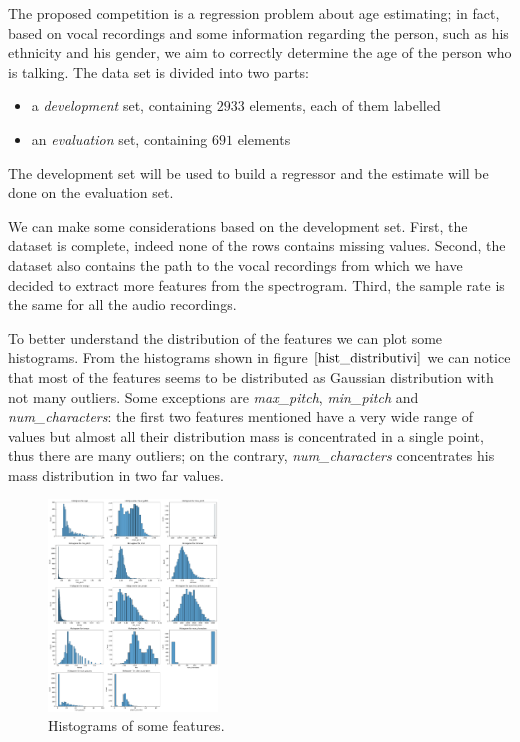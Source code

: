 The proposed competition is a regression problem about age estimating; in fact, based on vocal recordings and some information regarding the person, such as his ethnicity and his gender, we aim to correctly determine the age of the person who is talking.
The data set is divided into two parts:
\begin{itemize}
    \item a \emph{development} set, containing $2933$ elements, each of them labelled  
    \item an \emph{evaluation} set, containing $691$ elements
\end{itemize}
The development set will be used to build a regressor and the estimate will be done on the evaluation set.

We can make some considerations based on the development set. First, the dataset is complete, indeed none of the rows contains missing values. 
Second, the dataset also contains the path to the vocal recordings from which we have decided to extract more features from the spectrogram.
Third, the sample rate is the same for all the audio recordings.

To better understand the distribution of the features we can plot some histograms.
From the histograms shown in figure $\eqref{hist_distributivi}$ we can notice that most of the features seems to be distributed as Gaussian distribution with not many outliers. 
Some exceptions are \textit{max\_pitch}, \textit{min\_pitch} and \textit{num\_characters}: the first two features mentioned have a very wide range of values but almost all their distribution mass is concentrated in a single point, thus there are many outliers; on the contrary, \textit{num\_characters} concentrates his mass distribution in two far values.

\begin{figure}
    \includegraphics[width = 0.40\textwidth]{img/distribution.pdf}
    \caption{Histograms of some features.}
    \label{hist_distributivi}
\end{figure}

